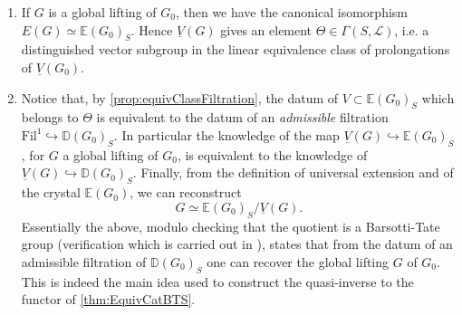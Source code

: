 \begin{rem}[]
\begin{enumerate}
	\item If $G$ is a global lifting of $G_0$, then we have the canonical isomorphism
		$E(G) \simeq \mathbb{E}(G_0)_S$.
		Hence $\underline{V}(G)$ gives an element $\Theta \in \Gamma(S,\mathscr{L})$,
		i.e. a distinguished vector subgroup in the linear equivalence
		class of prolongations of $\underline{V}(G_0)$.

	\item Notice that, by \cref{prop:equivClassFiltration}, the datum of 
		$V \subset \mathbb{E}(G_0)_S$ which belongs to $\Theta$ is
		equivalent to the datum of an {\em admissible} filtration
		$\mathrm{Fil}^1 \hookrightarrow \mathbb{D}(G_0)_S$.
		In particular the knowledge of the map
		$\underline{V}(G) \hookrightarrow \mathbb{E}(G_0)_S$, for $G$ a global
		lifting of $G_0$, is equivalent to the knowledge of
		$\underline{V}(G) \hookrightarrow \mathbb{D}(G_0)_S$.
		Finally, from the definition of universal extension
		and of the crystal $\mathbb{E}(G_0)$, we can reconstruct 
		\begin{equation*}
			G \simeq \mathbb{E}(G_0)_S/\underline{V}(G)
		.\end{equation*}
		Essentially the above, modulo checking that the quotient is
		a Barsotti-Tate group (verification which is carried out in
		\cite[Chapter V, theorem 1.6]{Messing}), states that from 
		the datum of an admissible filtration of $\mathbb{D}(G_0)_S$
		one can recover the global lifting $G$ of $G_0$.
		This is indeed the main idea used to construct the quasi-inverse
		to the functor of \cref{thm:EquivCatBTS}.
\end{enumerate}
\end{rem}
